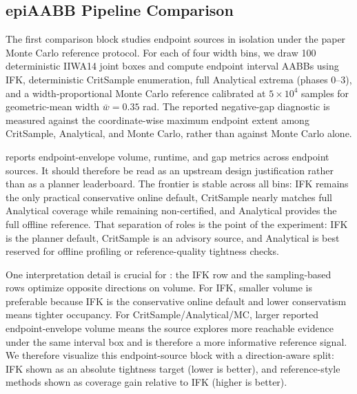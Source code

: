\documentclass[journal]{IEEEtran}
\begin{document}

\subsection{epiAABB Pipeline Comparison}\label{sec:exp_epiaabb}

The first comparison block studies endpoint sources in isolation under the
paper Monte Carlo reference protocol. For each of four width bins,
we draw 100 deterministic IIWA14 joint boxes and compute endpoint interval
AABBs using IFK, deterministic CritSample enumeration, full Analytical
extrema (phases 0--3), and a width-proportional Monte Carlo reference
calibrated at $5\times 10^4$ samples for geometric-mean width
$\bar{w}=0.35$ rad. The reported negative-gap diagnostic is measured against
the coordinate-wise maximum endpoint extent among CritSample, Analytical, and
Monte Carlo, rather than against Monte Carlo alone.

 reports endpoint-envelope
volume, runtime, and gap metrics across endpoint sources. It should therefore
be read as an upstream design justification rather than as a planner
leaderboard. The frontier is stable
across all bins: IFK remains the only practical conservative online default,
CritSample nearly matches full Analytical coverage while remaining
non-certified, and Analytical provides the full offline reference. That
separation of roles
is the point of the experiment: IFK is the planner default, CritSample is an
advisory source, and Analytical is best reserved for offline profiling or
reference-quality tightness checks.

One interpretation detail is crucial for : the IFK
row and the sampling-based rows optimize opposite directions on volume. For
IFK, smaller volume is preferable because IFK is the conservative online default
and lower conservatism means tighter occupancy. For
CritSample/Analytical/MC, larger reported endpoint-envelope volume means the
source explores more reachable evidence under the same interval box and is
therefore a more informative reference signal. We therefore visualize this endpoint-source block with a
direction-aware split: IFK shown as an absolute tightness target (lower is
better), and reference-style methods shown as coverage gain relative to IFK
(higher is better).


\end{document}
